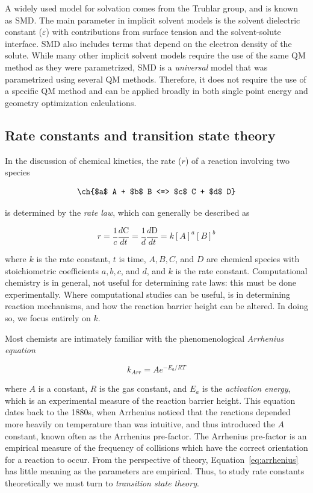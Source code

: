 \begin{doublespace}
A widely used model for solvation comes from the Truhlar group, and is known as
SMD.\cite{Marenich2009} The main parameter in implicit solvent models is the
solvent dielectric constant ($\varepsilon$) with contributions from surface
tension and the solvent-solute interface. SMD also includes terms that depend
on the electron density of the solute.  While many other implicit solvent
models require the use of the same QM method as they were
parametrized,\cite{Ho2010} SMD is a \emph{universal} model that was
parametrized using several QM methods. Therefore, it does not require the use
of a specific QM method and can be applied broadly in both single point energy
and geometry optimization calculations.

\subsection{Rate constants and transition state theory}

In the discussion of chemical kinetics, the rate ($r$) of a reaction involving
two species

\begin{equation}
  \ch{$a$ A + $b$ B <=> $c$ C + $d$ D}
  \label{eq:a}
\end{equation}

\noindent is determined by the \emph{rate law}, which can generally be
described as

\begin{equation}
  r = \frac{1}{c}\frac{d \text{C}}{dt} = \frac{1}{d}\frac{d \text{D}}{dt} = k[A]^a [B]^b
\end{equation}

\noindent where $k$ is the rate constant, $t$ is time, $A, B, C$, and $D$ are
chemical species with stoichiometric coefficients $a, b, c$, and $d$, and $k$
is the rate constant. Computational chemistry is in general, not useful for
determining rate laws: this must be done experimentally. Where computational
studies can be useful, is in determining reaction mechanisms, and how the
reaction barrier height can be altered. In doing so, we focus entirely on $k$.

Most chemists are intimately familiar with the phenomenological \emph{Arrhenius
equation}

\begin{equation}
  k_{Arr} = Ae^{-E_a/RT}
\label{eq:arrhenius}
\end{equation}

\noindent where $A$ is a constant, $R$ is the gas constant, and $E_a$ is the
\emph{activation energy}, which is an experimental measure of the reaction
barrier height. This equation dates back to the 1880s, when Arrhenius noticed
that the reactions depended more heavily on temperature than was intuitive, and
thus introduced the $A$ constant, known often as the Arrhenius
pre-factor.\cite{McQuarrie1997} The Arrhenius pre-factor is an empirical measure
of the frequency of collisions which have the correct orientation for a reaction
to occur. From the perspective of theory, Equation~\ref{eq:arrhenius} has little
meaning as the parameters are empirical. Thus, to study rate constants
theoretically we must turn to \emph{transition state theory}.


\end{doublespace}
